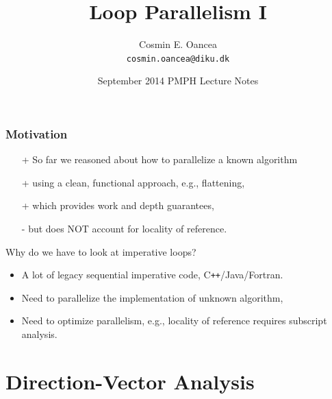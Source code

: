 \documentclass{beamer}
\title[Loop Parallelism]{Loop Parallelism I}
\author[C.~Oancea]{Cosmin E. Oancea\\{\tt cosmin.oancea@diku.dk}}
\institute{Department of Computer Science (DIKU)\\University of Copenhagen}
\date[Sept 2014]{September 2014 PMPH Lecture Notes}
\newcommand{\emp}[1]{\textcolor{DikuRed}{ #1}}
\begin{document}
\titleslide




\begin{frame}
  \frametitle{Motivation}

\begin{itemize}
    \item[+] So far we reasoned about how to parallelize a known algorithm
    \item[+] using a clean, functional approach, e.g., flattening, 
    \item[+] which provides work and depth guarantees,
    \item[\alert{-}] but does \alert{NOT} account for locality of reference.

\end  {itemize}\bigskip

\emp{Why do we have to look at imperative loops?}
\begin{itemize}    
    \item A lot of legacy sequential imperative code, C{\tt++}/Java/Fortran.\medskip
    \item Need to parallelize the implementation of unknown algorithm,\medskip
    \item Need to optimize parallelism, e.g., locality of reference requires subscript analysis. 
\end  {itemize}  

\end{frame}


\section{Direction-Vector Analysis}

\begin{frame}[fragile]
	\tableofcontents[currentsection]
\end{frame}
\end{document}
